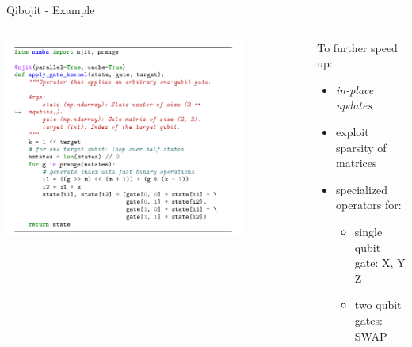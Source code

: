 \documentclass[11pt]{beamer}
\begin{document}
\begin{frame}[fragile]{Qibojit - Example}

    \begin{columns}
        \begin{column}{0.7\textwidth}
            \hspace{1cm}
            \includegraphics[width = 0.8\textwidth]{figures/circuit.png}
        \end{column}

        \begin{column}{0.6\textwidth}
            To further speed up:
            \begin{itemize}
                \item \emph{in-place updates}
                \item exploit sparsity of matrices
                \item specialized operators for:
                \begin{itemize}
                    \item single qubit gate: X, Y Z
                    \item two qubit gates: SWAP
                \end{itemize}
            \end{itemize}
        \end{column}
    \end{columns}

    
\end{frame}
\end{document}
